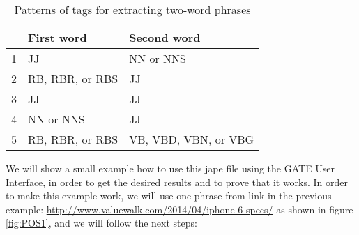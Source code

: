 \begin{table}\centering
	\caption{Patterns of tags for extracting two-word phrases}\label{tab:twoWordPhrases}
   \begin{tabular}{|l|l|l|}
   	\hline
   	\textbf{ }  & \textbf{First word}  & \textbf{Second word} \\ \hline
	1&JJ &NN or NNS \\ \hline
	2&RB, RBR, or RBS &JJ \\ \hline
	3&JJ &JJ \\ \hline
	4&NN or NNS &JJ \\ \hline
	5&RB, RBR, or RBS &VB, VBD, VBN, or VBG \\ \hline
    \end{tabular}
\end{table}
\pagebreak
We will show a small example how to use this jape file using the GATE User Interface, in order to get the desired results and to prove that it works. In order to make this example work, we will use one phrase from link in the previous example: \url{http://www.valuewalk.com/2014/04/iphone-6-specs/} as shown in figure \ref{fig:POS1}, and we will follow the next steps:

